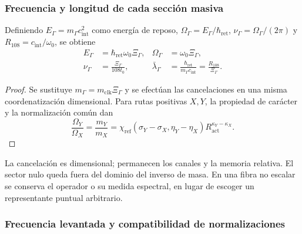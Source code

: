\subsubsection{Frecuencia y longitud de cada sección masiva}
\label{md:hib:frecuencia-longitud}

Definiendo $E_\Gamma=m_\Gamma c_{\mathrm{int}}^2$ como energía de reposo,
$\Omega_\Gamma=E_\Gamma/\hbar_{\mathrm{ret}}$,
$\nu_\Gamma=\Omega_\Gamma/(2\pi)$ y
$R_{108}=c_{\mathrm{int}}/\omega_0$, se obtiene
\begin{equation}
 \begin{aligned}
 E_\Gamma&=\hbar_{\mathrm{ret}}\omega_0\Xi_\Gamma,&
 \Omega_\Gamma&=\omega_0\Xi_\Gamma,\\
 \nu_\Gamma&=\frac{\Xi_\Gamma}{108t_0},&
 \bar\lambda_\Gamma&=
 \frac{\hbar_{\mathrm{ret}}}{m_\Gamma c_{\mathrm{int}}}
 =\frac{R_{108}}{\Xi_\Gamma}.
 \end{aligned}
 \label{md:hib:frecuencias}
\end{equation}
\begin{proof}
Se sustituye $m_\Gamma=m_{\mathrm{clk}}\Xi_\Gamma$ y se efectúan las
cancelaciones en una misma coordenatización dimensional. Para rutas positivas $X,Y$,
la propiedad de carácter y la normalización común dan
\begin{equation}
 \frac{\Omega_Y}{\Omega_X}=\frac{m_Y}{m_X}
 =\chi_{\mathrm{ref}}(\sigma_Y-\sigma_X,\eta_Y-\eta_X)
 R_{\mathrm{act}}^{\kappa_Y-\kappa_X}.
 \label{md:hib:cocientes}
\end{equation}
\end{proof}
La cancelación es dimensional; permanecen los canales y la memoria
relativa. El sector nulo queda fuera del dominio del inverso de masa.
En una fibra no escalar se conserva el operador o su medida espectral,
en lugar de escoger un representante puntual arbitrario.

\subsubsection{Frecuencia levantada y compatibilidad de normalizaciones}
\label{md:hib:tres-frecuencias}

